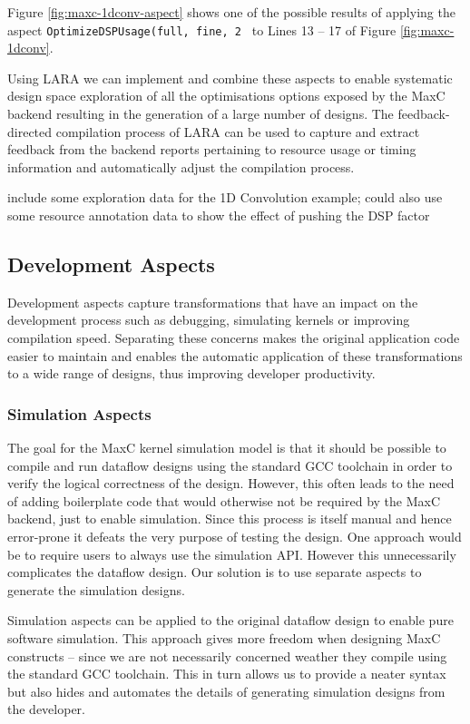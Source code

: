 Figure \ref{fig:maxc-1dconv-aspect} shows one of the possible results
of applying the aspect \texttt{OptimizeDSPUsage(full, fine, 2 } to
Lines 13 -- 17 of Figure \ref{fig:maxc-1dconv}.

Using LARA we can implement and combine these aspects to enable
systematic design space exploration of all the optimisations options
exposed by the MaxC backend resulting in the generation of a large
number of designs. The feedback-directed compilation process of LARA can
be used to capture and extract feedback from the backend reports
pertaining to resource usage or timing information and automatically
adjust the compilation process.

\TODO include some exploration data for the 1D Convolution example;
could also use some resource annotation data to show the effect of
pushing the DSP factor

\subsection{Development Aspects}

Development aspects capture transformations that have an impact on the
development process such as debugging, simulating kernels or improving
compilation speed. Separating these concerns makes the original
application code easier to maintain and enables the automatic
application of these transformations to a wide range of designs, thus
improving developer productivity.

\subsubsection{Simulation Aspects}

The goal for the MaxC kernel simulation model is that it should be
possible to compile and run dataflow designs using the standard GCC
toolchain in order to verify the logical correctness of the
design. However, this often leads to the need of adding boilerplate
code that would otherwise not be required by the MaxC backend, just to
enable simulation. Since this process is itself manual and hence
error-prone it defeats the very purpose of testing the design. One
approach would be to require users to always use the simulation
API. However this unnecessarily complicates the dataflow design. Our
solution is to use separate aspects to generate the simulation
designs.

Simulation aspects can be applied to the original dataflow design to
enable pure software simulation. This approach gives more freedom when
designing MaxC constructs -- since we are not necessarily concerned
weather they compile using the standard GCC toolchain. This in turn
allows us to provide a neater syntax but also hides and automates the
details of generating simulation designs from the developer.

